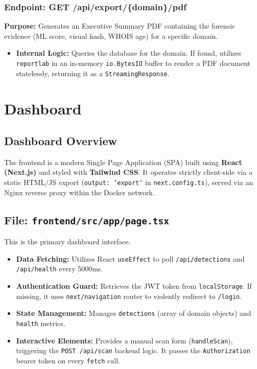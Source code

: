 \documentclass[12pt,a4paper]{report}
\begin{document}
\subsection{Endpoint: GET /api/export/\{domain\}/pdf}
\textbf{Purpose:} Generates an Executive Summary PDF containing the forensic evidence (ML score, visual hash, WHOIS age) for a specific domain.
\begin{itemize}
\item \textbf{Internal Logic:} Queries the database for the domain. If found, utilizes \texttt{reportlab} in an in-memory \texttt{io.BytesIO} buffer to render a PDF document statelessly, returning it as a \texttt{StreamingResponse}.
\end{itemize}

\chapter{Dashboard}
\section{Dashboard Overview}
The frontend is a modern Single Page Application (SPA) built using \textbf{React (Next.js)} and styled with \textbf{Tailwind CSS}. It operates strictly client-side via a static HTML/JS export (\texttt{output: 'export'} in \texttt{next.config.ts}), served via an Nginx reverse proxy within the Docker network.

\section{File: \texttt{frontend/src/app/page.tsx}}
This is the primary dashboard interface.
\begin{itemize}
\item \textbf{Data Fetching:} Utilizes React \texttt{useEffect} to poll \texttt{/api/detections} and \texttt{/api/health} every 5000ms.
\item \textbf{Authentication Guard:} Retrieves the JWT token from \texttt{localStorage}. If missing, it uses \texttt{next/navigation} router to violently redirect to \texttt{/login}.
\item \textbf{State Management:} Manages \texttt{detections} (array of domain objects) and \texttt{health} metrics.
\item \textbf{Interactive Elements:} Provides a manual scan form (\texttt{handleScan}), triggering the \texttt{POST /api/scan} backend logic. It passes the \texttt{Authorization} bearer token on every \texttt{fetch} call.
\end{itemize}
\end{document}
